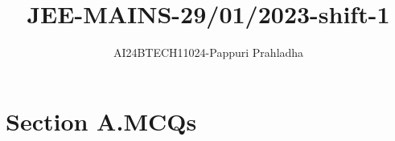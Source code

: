 \documentclass[journal]{IEEEtran}
\begin{document}

\vspace{3cm}

\title{JEE-MAINS-29/01/2023-shift-1}
\author{AI24BTECH11024-Pappuri Prahladha}
{\let\newpage\relax\maketitle}

\renewcommand{\thefigure}{\theenumi}
\renewcommand{\thetable}{\theenumi}
\setlength{\intextsep}{10pt} %


\renewcommand{\thetable}{\theenumi}
\section{Section A.MCQs}
\end{document}
